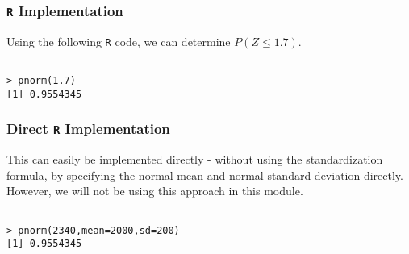 \documentclass[a4]{beamer}
\begin{document}
\begin{frame}[fragile]
\frametitle{\texttt{R} Implementation}


Using the following \texttt{R} code, we can determine $P(Z \leq 1.7)$.
\begin{verbatim}

> pnorm(1.7)
[1] 0.9554345

\end{verbatim}
\end{frame}


\begin{frame}[fragile]
\frametitle{Direct \texttt{R} Implementation}

This can easily be implemented directly - without using the standardization formula, by specifying the normal mean and normal standard deviation directly. However, we will not be using this approach in this module.
\begin{verbatim}

> pnorm(2340,mean=2000,sd=200)
[1] 0.9554345


\end{verbatim}
\end{frame}
\end{document}
